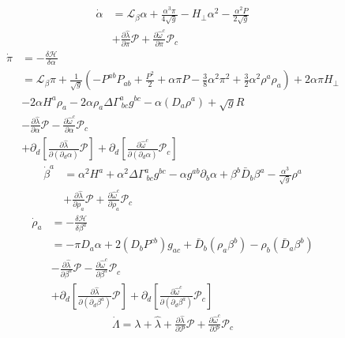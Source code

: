 \documentclass{article}
\begin{document}
\begin{align*}
{\dot \alpha} & = \mathcal{L}_{\beta}\alpha + \frac{\alpha^3 \pi}{4 \sqrt{g}} - H_{\perp}\alpha^2 - \frac{\alpha^2 P}{2\sqrt{g}}\\
& + \frac{\partial {\hat \lambda}}{\partial \pi}\mathscr{P} + \frac{\partial {\hat \omega}^{c}}{\partial \pi}\mathscr{P}_{c}
\end{align*}
\begin{align*}
{\dot \pi} & = - \frac{\delta \mathcal{H}}{\delta \alpha} \\
& = \mathcal{L}_{\beta} \pi + \frac{1}{\sqrt{g}}(-P^{ab}P_{ab} + \frac{P^2}{2} + \alpha \pi P - \frac{3}{8}\alpha^2 \pi^2 + \frac{3}{2}\alpha^2 \rho^{a}\rho_{a}) + 2\alpha \pi H_{\perp} \\
& - 2 \alpha H^{a}\rho_{a} - 2\alpha \rho_{a} \Delta \Gamma^{a}_{~bc}g^{bc} - \alpha (D_{a}\rho^{a}) + \sqrt{g}R\\
& - \frac{\partial {\hat \lambda}}{\partial \alpha}\mathscr{P} - \frac{\partial {\hat \omega}^{c}}{\partial \alpha}\mathscr{P}_{c}\\
& + \partial_{d}[\frac{\partial {\hat \lambda}}{\partial(\partial_{d}\alpha)}\mathscr{P}] + \partial_{d}[\frac{\partial {\hat \omega^{c}}}{\partial(\partial_{d}\alpha)}\mathscr{P}_{c}]
\end{align*}
\begin{align*}
{\dot \beta}^{a} & = \alpha^2 H^{a} + \alpha^2\Delta \Gamma^{a}_{~bc}g^{bc} - \alpha g^{ab}\partial_{b}\alpha + \beta^{b}{\bar D}_{b}\beta^{a} - \frac{\alpha^3}{\sqrt{g}} \rho^{a}\\
& + \frac{\partial {\hat \lambda}}{\partial \rho_{a}}\mathscr{P} + \frac{\partial {\hat \omega}^{c}}{\partial \rho_{a}}\mathscr{P}_{c}
\end{align*}
\begin{align*}
{\dot \rho}_{a} & = -\frac{\delta \mathcal{H}}{\delta \beta^{a}}\\
& = -\pi D_{a} \alpha + 2(D_{b}P^{cb})g_{ac} + {\bar D}_{b}(\rho_{a}\beta^{b}) - \rho_{b}({\bar D}_{a}\beta^{b})\\
& - \frac{\partial {\hat \lambda}}{\partial \beta^{a}}\mathscr{P} - \frac{\partial {\hat \omega}^{c}}{\partial \beta^{a}}\mathscr{P}_{c}\\
& + \partial_{d}[\frac{\partial {\hat \lambda}}{\partial(\partial_{d}\beta^{a})}\mathscr{P}] + \partial_{d}[\frac{\partial {\hat \omega^{c}}}{\partial(\partial_{d}\beta^{a})}\mathscr{P}_{c}]
\end{align*}
\begin{align*}
{\dot \Lambda} = \lambda + {\hat \lambda} + \frac{\partial {\hat \lambda}}{\partial \mathscr{P}}\mathscr{P} + \frac{\partial {\hat \omega}^{c}}{\partial \mathscr{P}}\mathscr{P}_{c}
\end{align*}
\end{document}
